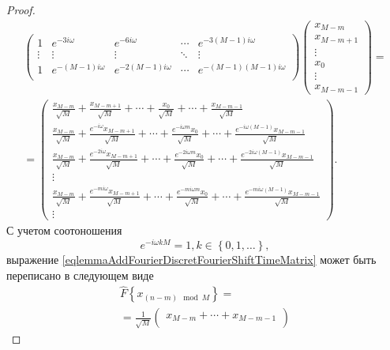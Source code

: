 \begin{proof}
\begin{eqnarray}
\begin{pmatrix}
1 & e^{-3 i \omega} & e^{-6 i \omega} & \cdots & 
e^{-3 \left( M - 1 \right) i \omega} \\
\vdots & \vdots & \vdots & \ddots & \vdots \\
1 & e^{-\left( M - 1 \right) i \omega} & e^{-2\left( M - 1 \right) i \omega} & \cdots & 
e^{- \left( M - 1 \right)\left( M - 1 \right) i \omega} \\
\end{pmatrix}
\begin{pmatrix}
x_{M - m} \\
x_{M - m + 1}\\ 
\vdots \\
x_0 \\
\vdots \\
x_{M - m - 1}
\end{pmatrix} = 
\nonumber \\
= 
\begin{pmatrix}
\frac{x_{M - m}}{\sqrt{M}} + \frac{x_{M - m + 1}}{\sqrt{M}} + \cdots + 
\frac{x_0}{\sqrt{M}} + \cdots + \frac{x_{M - m - 1}}{\sqrt{M}}\\
\frac{x_{M - m}}{\sqrt{M}} + 
\frac{e^{-i \omega} x_{M - m + 1}}{\sqrt{M}} + 
\cdots + 
\frac{e^{-i \omega m  } x_0}{\sqrt{M}} + 
\cdots +
\frac{e^{-i \omega \left( M - 1 \right) } x_{M - m - 1}}{\sqrt{M}}\\ 
\frac{x_{M - m}}{\sqrt{M}} + 
\frac{e^{-2 i \omega} x_{M - m + 1}}{\sqrt{M}} + 
\cdots + 
\frac{e^{-2 i \omega m  } x_0}{\sqrt{M}} + 
\cdots +
\frac{e^{-2 i \omega \left( M - 1 \right) } x_{M - m - 1}}{\sqrt{M}}\\ 
\vdots \\
\frac{x_{M - m}}{\sqrt{M}} + 
\frac{e^{-m i \omega} x_{M - m + 1}}{\sqrt{M}} + 
\cdots + 
\frac{e^{-m i \omega m  } x_0}{\sqrt{M}} + 
\cdots +
\frac{e^{-m i \omega \left( M - 1 \right) } x_{M - m - 1}}{\sqrt{M}}\\ 
\vdots 
\end{pmatrix}.
\label{eqlemmaAddFourierDiscretFourierShiftTimeMatrix}
\end{eqnarray}
С учетом соотоношения
\[
e^{-i \omega k M} = 1, k \in \left\{0, 1, \dots \right\},
\]
выражение
\eqref{eqlemmaAddFourierDiscretFourierShiftTimeMatrix} может
быть переписано в следующем виде
\begin{eqnarray}
\hat{F}\left\{x_{\left(n - m\right) \mod M}\right\} = 
\nonumber \\
=
\frac{1}{\sqrt{M}}
\begin{pmatrix}
x_{M - m} + \cdots +
x_{M - m - 1}\\

\end{pmatrix}
\end{eqnarray}
\end{proof}
